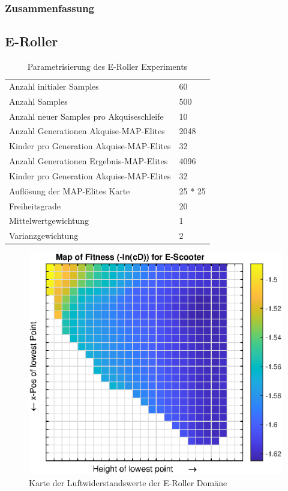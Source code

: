 





\subsubsection{Zusammenfassung}


\subsection{E-Roller}

\begin{table}[h]
	\centering
	\begin{tabularx}{.75\textwidth}{ll}\hline
		Anzahl initialer Samples & 60 \\
		Anzahl Samples & 500 \\
		Anzahl neuer Samples pro Akquiseschleife & 10 \\
		Anzahl Generationen Akquise-MAP-Elites & 2048 \\
		Kinder pro Generation Akquise-MAP-Elites & 32 \\
		Anzahl Generationen Ergebnis-MAP-Elites & 4096 \\
		Kinder pro Generation Akquise-MAP-Elites & 32 \\
		Auflösung der MAP-Elites Karte & 25 * 25  \\
		\hline
		Freiheitsgrade & 20 \\
		Mittelwertgewichtung & 1 \\
		Varianzgewichtung & 2 \\
	\end{tabularx}
	\label{tab:parmasEscooter}
	\caption{Parametrisierung des E-Roller Experiments}
\end{table}



\begin{figure}[h]
	\centering
	\includegraphics[width=.7\linewidth]{bilder/escooter/dragMapEscooter}
	\caption{Karte der Luftwiderstandswerte der E-Roller Domäne}
	\label{fig:dragMapEscooter}
\end{figure}

